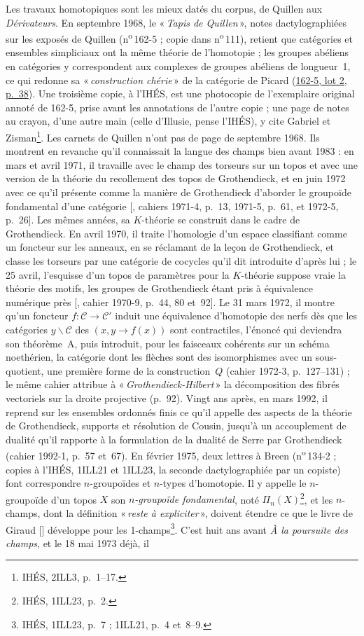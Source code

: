 \documentclass[11pt]{amsart}
\makeatletter
\newcommand{\q}[1]{«\,\textit{#1}\,»}
\newcommand{\cote}[1]{\mbox{n\textsuperscript{o}\,#1}}
\def\RHM@first#1--#2\@nil{#1}
\DeclareRobustCommand{\lot}[3]{\begingroup\edef\RHM@pdfpage{\the\numexpr\RHM@first#3--\@nil+1\relax}\href{https://grothendieck.umontpellier.fr/#1.pdf\#page=\RHM@pdfpage}{#1, lot #2, p.~#3}\endgroup}
\newcommand{\lot}[3]{\href{https://grothendieck.commutator.io/\##1/#2/p#3}{#1, lot #2, p.~#3}}
\makeatother
\begin{document}
Les travaux homotopiques sont les mieux datés du corpus, de Quillen aux \emph{Dérivateurs}. En septembre 1968, le \q{Tapis de Quillen}, notes dactylographiées sur les exposés de Quillen (\cote{162-5} ; copie dans \cote{111}), retient que catégories et ensembles simpliciaux ont la même théorie de l'homotopie ; les groupes abéliens en catégories y correspondent aux complexes de groupes abéliens de longueur~1, ce qui redonne sa \q{construction chérie} de la catégorie de Picard (\lot{162-5}{2}{38}). Une troisième copie, à l'IHÉS, est une photocopie de l'exemplaire original annoté de 162-5, prise avant les annotations de l'autre copie ; une page de notes au crayon, d'une autre main (celle d'Illusie, pense l'IHÉS), y cite Gabriel et Zisman\footnote{IHÉS, 2ILL3, p.~1--17.}. Les carnets de Quillen n'ont pas de page de septembre 1968. Ils montrent en revanche qu'il connaissait la langue des champs bien avant 1983 : en mars et avril 1971, il travaille avec le champ des torseurs sur un topos et avec une version de la théorie du recollement des topos de Grothendieck, et en juin 1972 avec ce qu'il présente comme la manière de Grothendieck d'aborder le groupoïde fondamental d'une catégorie [\citealp{quillennotebooks}, cahiers 1971-4, p.~13, 1971-5, p.~61, et 1972-5, p.~26]. Les mêmes années, sa $K$-théorie se construit dans le cadre de Grothendieck. En avril 1970, il traite l'homologie d'un espace classifiant comme un foncteur sur les anneaux, en se réclamant de la leçon de Grothendieck, et classe les torseurs par une catégorie de cocycles qu'il dit introduite d'après lui ; le 25 avril, l'esquisse d'un topos de paramètres pour la $K$-théorie suppose vraie la théorie des motifs, les groupes de Grothendieck étant pris à équivalence numérique près [\citealp{quillennotebooks}, cahier 1970-9, p.~44, 80 et~92]. Le 31 mars 1972, il montre qu'un foncteur $f : \mathcal{C}\to\mathcal{C}'$ induit une équivalence d'homotopie des nerfs dès que les catégories $y\backslash\mathcal{C}$ des $(x, y \to f(x))$ sont contractiles, l'énoncé qui deviendra son théorème~A, puis introduit, pour les faisceaux cohérents sur un schéma noethérien, la catégorie dont les flèches sont des isomorphismes avec un sous-quotient, une première forme de la construction~$Q$ (cahier 1972-3, p.~127--131) ; le même cahier attribue à \q{Grothendieck-Hilbert} la décomposition des fibrés vectoriels sur la droite projective (p.~92). Vingt ans après, en mars 1992, il reprend sur les ensembles ordonnés finis ce qu'il appelle des aspects de la théorie de Grothendieck, supports et résolution de Cousin, jusqu'à un accouplement de dualité qu'il rapporte à la formulation de la dualité de Serre par Grothendieck (cahier 1992-1, p.~57 et~67). En février 1975, deux lettres à Breen (\cote{134-2} ; copies à l'IHÉS, 1ILL21 et 1ILL23, la seconde dactylographiée par un copiste) font correspondre $n$-groupoïdes et $n$-types d'homotopie. Il y appelle le $n$-groupoïde d'un topos $X$ son \emph{$n$-groupoïde fondamental}, noté $\Pi_{n}(X)$\footnote{IHÉS, 1ILL23, p.~2.}, et les $n$-champs, dont la définition \q{reste à expliciter}, doivent étendre ce que le livre de Giraud [\citealp{giraud1971}] développe pour les 1-champs\footnote{IHÉS, 1ILL23, p.~7 ; 1ILL21, p.~4 et~8--9.}. C'est huit ans avant \emph{À la poursuite des champs}, et le 18 mai 1973 déjà, il 
\end{document}
